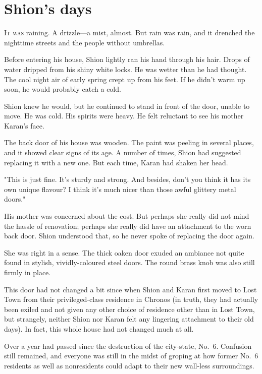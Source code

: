 
\chapter{Shion's days}

\lettrine{I}{t was} raining. A drizzle---a mist, almost. But rain was rain, and it
drenched the nighttime streets and the people without umbrellas.

Before entering his house, Shion lightly ran his hand through his hair.
Drops of water dripped from his shiny white locks. He was wetter than he
had thought. The cool night air of early spring crept up from his feet.
If he didn't warm up soon, he would probably catch a cold.

Shion knew he would, but he continued to stand in front of the door,
unable to move. He was cold. His spirits were heavy. He felt reluctant
to see his mother Karan's face.

The back door of his house was wooden. The paint was peeling in several
places, and it showed clear signs of its age. A number of times, Shion
had suggested replacing it with a new one. But each time, Karan had
shaken her head.

"This is just fine. It's sturdy and strong. And besides, don't you think
it has its own unique flavour? I think it's much nicer than those awful
glittery metal doors."

His mother was concerned about the cost. But perhaps she really did not
mind the hassle of renovation; perhaps she really did have an attachment
to the worn back door. Shion understood that, so he never spoke of
replacing the door again.

She was right in a sense. The thick oaken door exuded an ambiance not
quite found in stylish, vividly-coloured steel doors. The round brass
knob was also still firmly in place.

This door had not changed a bit since when Shion and Karan first moved
to Lost Town from their privileged-class residence in Chronos (in truth,
they had actually been exiled and not given any other choice of
residence other than in Lost Town, but strangely, neither Shion nor
Karan felt any lingering attachment to their old days). In fact, this
whole house had not changed much at all.

Over a year had passed since the destruction of the city-state, No.~6.
Confusion still remained, and everyone was still in the midst of groping
at how former No.~6 residents as well as nonresidents could adapt to
their new wall-less surroundings.

